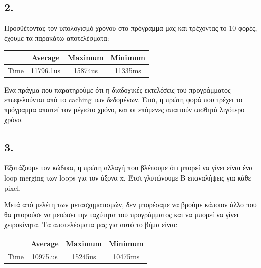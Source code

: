 \documentclass{article}
\newcommand{\english}[1]{\foreignlanguage{english}{{#1}}}
\begin{document}
\subsection*{2.}

Προσθέτοντας τον υπολογισμό χρόνου στο πρόγραμμα μας και τρέχοντας το 10 φορές, έχουμε τα παρακάτω αποτελέσματα: \\
\begin{otherlanguage}{english}
    \begin{center}
        \begin{tabular}{|c|c|c|c|}\hline
            & Average & Maximum & Minimum \\ \hline
            Time &  11796.1us & 15874us & 11335ms\\ \hline
       \end{tabular}
    \end{center}
    \end{otherlanguage}

    Ένα πράγμα που παρατηρούμε ότι η διαδοχικές εκτελέσεις του προγράμματος επωφελούνται από το \english{caching} των δεδομένων. Έτσι, η πρώτη φορά που τρέχει το πρόγραμμα απαιτεί τον μέγιστο χρόνο, και οι επόμενες απαιτούν αισθητά λιγότερο χρόνο. 

\subsection*{3.}

Εξατάζουμε τον κώδικα, η πρώτη αλλαγή που βλέπουμε ότι μπορεί να γίνει είναι ένα \english{loop merging} των loops για τον άξονα x. Έτσι γλυτώνουμε \english{B} επαναλήψεις για κάθε \english{pixel}.

Μετά από μελέτη των μετασχηματισμών, δεν μπορέσαμε να βρούμε κάποιον άλλο που θα μπορούσε να μειώσει την ταχύτητα του προγράμματος και να μπορεί να γίνει χειροκίνητα. Τα αποτελέσματα μας για αυτό το βήμα είναι:

\begin{otherlanguage}{english}
    \begin{center}
        \begin{tabular}{|c|c|c|c|}\hline
            & Average & Maximum & Minimum \\ \hline
            Time &  10975.us & 15245us & 10475ms\\ \hline
       \end{tabular}
    \end{center}
    \end{otherlanguage}
\end{document}
